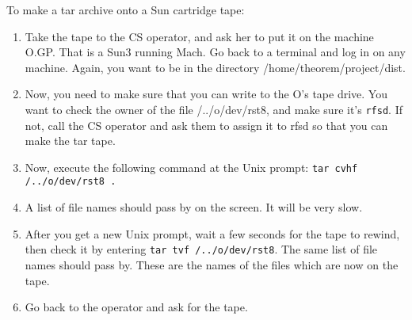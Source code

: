 To make a tar archive onto a Sun cartridge tape:
\begin{enumerate}
\item Take the tape to the CS operator, and ask her to put it on the machine
O.GP.  That is a Sun3 running Mach.  Go back to a terminal and log in on
any machine.  Again, you want to be in the directory /home/theorem/project/dist.

\item Now, you need to make sure that you can write to the O's tape drive.
You want to check the owner of the file /../o/dev/rst8, and make sure it's
{\tt rfsd}.  If not, call the CS operator and ask them to assign it to rfsd so
that you can make the tar tape.  

\item Now, execute the following command at the Unix prompt:
{\tt tar cvhf /../o/dev/rst8 .}

\item A list of file names should pass by on the screen.  It will be very slow.

\item After you get a new Unix prompt, wait a few seconds for the tape to rewind, 
then check it by entering
{\tt tar tvf /../o/dev/rst8}.
The same list of file names should pass by.  These are the names of
the files which are now on the tape.  

\item Go back to the operator and ask for the tape.

\end{enumerate}
